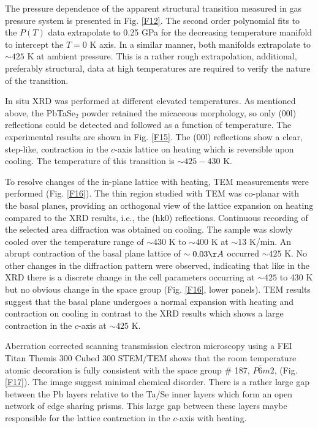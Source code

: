 \documentclass[aps,prb,preprint,groupedaddress,showpacs,amsmath,amssymb]{revtex4}
\begin{document}
The pressure dependence of the apparent structural transition measured in gas pressure system is presented in Fig. \ref{F12}. The second order polynomial fits to the $P(T)$ data extrapolate to 0.25 GPa for the decreasing temperature manifold to intercept the $T = 0$ K axis. In a similar manner, both manifolds extrapolate  to $\sim 425$ K at ambient pressure. This is a rather rough extrapolation, additional,  preferably structural, data at high temperatures are required to verify the nature of the transition.

In situ XRD was performed at different elevated temperatures. As mentioned above, the PbTaSe$_2$ powder retained the micaceous morphology, so only (00l) reflections could be detected and followed as a function of temperature. The experimental results are shown in Fig. \ref{F15}.  The (00l) reflections show a clear, step-like, contraction in the $c$-axis lattice on heating which is reversible upon cooling.  The temperature of this transition is $\sim 425-430$ K.

To resolve changes of the in-plane lattice with heating, TEM measurements were performed (Fig. \ref{F16}).  The thin region studied with TEM was co-planar with the basal planes, providing an orthogonal view of the lattice expansion on heating compared to the XRD results, i.e., the (hk0) reflections.  Continuous recording of the selected area diffraction was obtained on cooling. The sample was slowly cooled over the temperature range of $\sim 430$ K to $\sim 400$ K at $\sim 13$ K/min. An abrupt contraction of the basal plane lattice of $\sim 0.03 \AA$ occurred $\sim 425$ K. No other changes in the diffraction pattern were observed, indicating that like in the XRD there is a discrete change in the cell parameters occurring at $\sim 425$ to 430 K but no obvious change in the space group (Fig. \ref{F16}, lower panels). TEM results suggest that the basal plane undergoes a normal expansion with heating and contraction on cooling in contrast to the XRD results which shows a large contraction in the $c$-axis at $\sim 425$ K.

Aberration corrected scanning transmission electron microscopy using a FEI Titan Themis 300 Cubed 300 STEM/TEM shows that the room temperature atomic decoration is fully consistent with the space group \# 187, $P\bar{6}m2$, (Fig. \ref{F17}). The image suggest minimal chemical disorder. There is a rather large gap between the Pb layers relative to the Ta/Se inner layers which form an open network of edge sharing prisms.  This large gap between these layers maybe responsible for the lattice contraction in the $c$-axis with heating.
\end{document}
